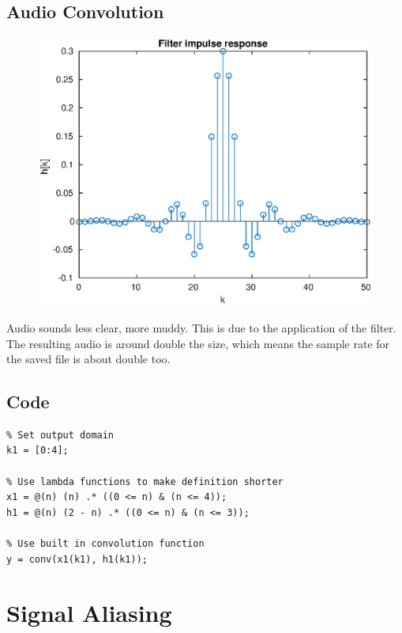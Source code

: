 \documentclass{article}
\begin{document}
\begin{multicols}{2}
    \subsection{Audio Convolution}
    \begin{figure}[H]
        \centering
        \includegraphics[width=\linewidth]{plot3}
        \caption{}
    \end{figure}
    Audio sounds less clear, more muddy. This is due to the application of the filter. The resulting audio is around double the size, which means the sample rate for the saved file is about double too.
    \subsection{Code}
    \begin{verbatim}
% Set output domain
k1 = [0:4];

% Use lambda functions to make definition shorter
x1 = @(n) (n) .* ((0 <= n) & (n <= 4));
h1 = @(n) (2 - n) .* ((0 <= n) & (n <= 3));

% Use built in convolution function
y = conv(x1(k1), h1(k1));
    \end{verbatim}

    \section{Signal Aliasing}

\end{multicols}
\end{document}
